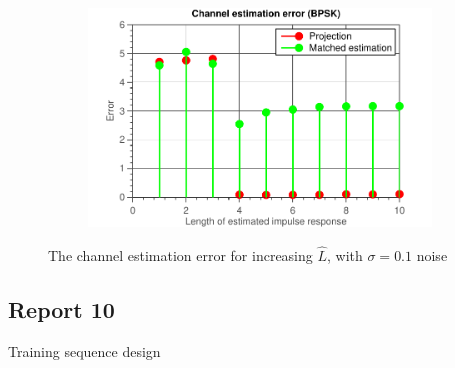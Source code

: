 \documentclass[11pt,titlepage]{report}
\begin{document}
\begin{figure}[H]
\begin{subfigure}{0.49\textwidth}
	\end{subfigure}
	\begin{subfigure}{0.49\textwidth}
		\includegraphics[width=\textwidth]{../../deliverable-7-resources/figures/ass-1/report-8-9-10/report-9-noise-0.1/ass-1-report-9-BPSK.pdf}
	\end{subfigure}
	\caption{The channel estimation error for increasing $\hat{L}$, with $\sigma = 0.1$ noise}
	\label{fig:rep9-0.1}
\end{figure}





\subsection{Report 10}
Training sequence design
\end{document}
